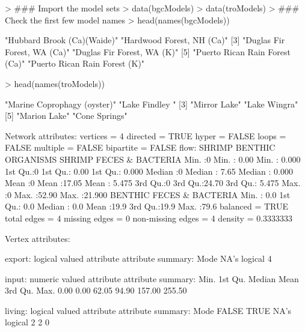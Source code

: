 \documentclass[11pt]{article}
\begin{document}
\begin{Schunk}
\begin{Sinput}
> ### Import the model sets
> data(bgcModels)
> data(troModels)
> ### Check the first few model names
> head(names(bgcModels))
\end{Sinput}
\begin{Soutput}
[1] "Hubbard Brook (Ca)(Waide)"     "Hardwood Forest, NH (Ca)"     
[3] "Duglas Fir Forest, WA (Ca)"    "Duglas Fir Forest, WA (K)"    
[5] "Puerto Rican Rain Forest (Ca)" "Puerto Rican Rain Forest (K)" 
\end{Soutput}
\begin{Sinput}
> head(names(troModels))
\end{Sinput}
\begin{Soutput}
[1] "Marine Coprophagy (oyster)" "Lake Findley "             
[3] "Mirror Lake"                "Lake Wingra"               
[5] "Marion Lake"                "Cone Springs"              
\end{Soutput}
\begin{Soutput}
Network attributes:
  vertices = 4
  directed = TRUE
  hyper = FALSE
  loops = FALSE
  multiple = FALSE
  bipartite = FALSE
  flow:
     SHRIMP  BENTHIC ORGANISMS SHRIMP FECES & BACTERIA
 Min.   :0   Min.   : 0.00     Min.   : 0.000         
 1st Qu.:0   1st Qu.: 0.00     1st Qu.: 0.000         
 Median :0   Median : 7.65     Median : 0.000         
 Mean   :0   Mean   :17.05     Mean   : 5.475         
 3rd Qu.:0   3rd Qu.:24.70     3rd Qu.: 5.475         
 Max.   :0   Max.   :52.90     Max.   :21.900         
 BENTHIC FECES & BACTERIA
 Min.   : 0.0            
 1st Qu.: 0.0            
 Median : 0.0            
 Mean   :19.9            
 3rd Qu.:19.9            
 Max.   :79.6            
  balanced = TRUE
 total edges = 4 
   missing edges = 0 
   non-missing edges = 4 
 density = 0.3333333 

Vertex attributes:

 export:
   logical valued attribute
   attribute summary:
   Mode    NA's 
logical       4 

 input:
   numeric valued attribute
   attribute summary:
   Min. 1st Qu.  Median    Mean 3rd Qu.    Max. 
   0.00    0.00   62.05   94.90  157.00  255.50 

 living:
   logical valued attribute
   attribute summary:
   Mode   FALSE    TRUE    NA's 
logical       2       2       0 


\end{Soutput}
\end{Schunk}
\end{document}
